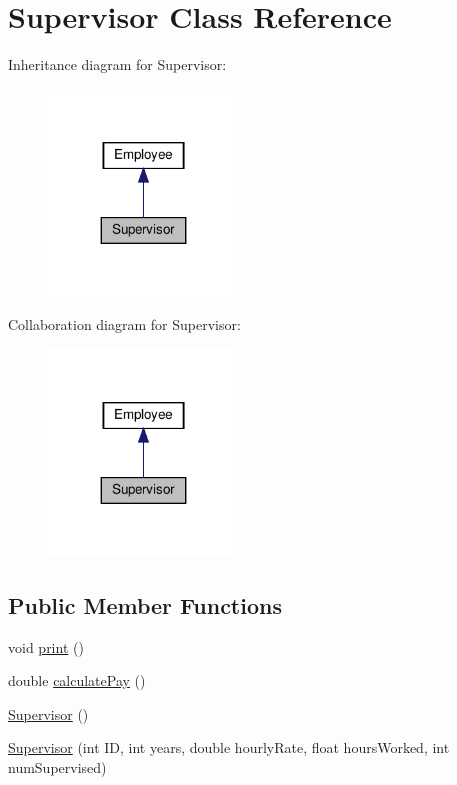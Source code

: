 \hypertarget{classSupervisor}{}\section{Supervisor Class Reference}
\label{classSupervisor}


Inheritance diagram for Supervisor\+:\nopagebreak
\begin{figure}[H]
\begin{center}
\leavevmode
\includegraphics[width=143pt]{classSupervisor__inherit__graph}
\end{center}
\end{figure}


Collaboration diagram for Supervisor\+:\nopagebreak
\begin{figure}[H]
\begin{center}
\leavevmode
\includegraphics[width=143pt]{classSupervisor__coll__graph}
\end{center}
\end{figure}
\subsection*{Public Member Functions}
\begin{DoxyCompactItemize}
\item 
void \hyperlink{classSupervisor_a92483dc9a54904d79b46c6ec4efb3f54}{print} ()
\item 
double \hyperlink{classSupervisor_aa37daa89523c08b84ae8141299e036f8}{calculate\+Pay} ()
\item 
\hyperlink{classSupervisor_a9d7eafc36b5429092ba0f758bc7841c4}{Supervisor} ()
\item 
\hyperlink{classSupervisor_a02d9245744652deb20e9408001d6ed3b}{Supervisor} (int ID, int years, double hourly\+Rate, float hours\+Worked, int num\+Supervised)
\end{DoxyCompactItemize}
